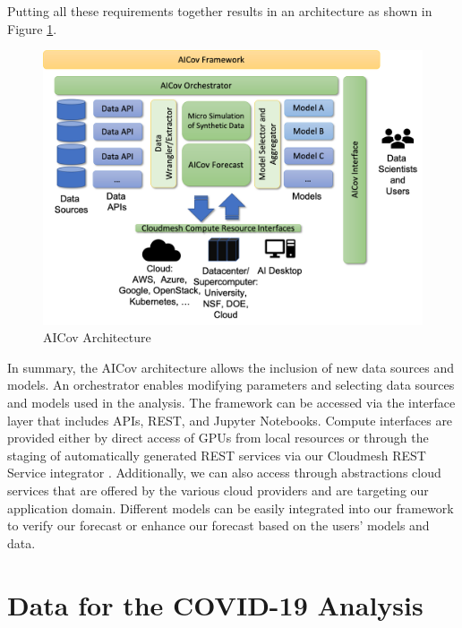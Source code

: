 \documentclass[12pt]{article}
\theoremstyle{definition}
\renewcommand{\_}{%
    \textunderscore\hspace{0pt}%
}
\begin{document}
Putting all these requirements together results in an architecture as shown in Figure \ref{fig:arch}.\\

\begin{figure}[h!]
    \centering
    \includegraphics[width=0.6\columnwidth]{images/arch.pdf}
    \caption{AICov Architecture}
    \label{fig:arch}
\end{figure}

In summary, the AICov architecture allows the inclusion of new data sources and models. An orchestrator enables modifying parameters and selecting data sources and models used in the analysis. The framework can be accessed via the interface layer that includes APIs, REST, and Jupyter Notebooks. Compute interfaces are provided either by direct access of GPUs from local resources or through the staging of automatically generated REST services via our Cloudmesh REST Service integrator \cite{cloudmesh-openapi-install,cloudmesh-openapi-benchmark,cloudmesh-manual}. Additionally, we can also access through abstractions cloud services that are offered by the various cloud providers and are targeting our application domain. Different models can be easily integrated into our framework to verify our forecast or enhance our forecast based on the users' models and data.

\section{Data for the COVID-19 Analysis}
\label{sec:data}
\end{document}
